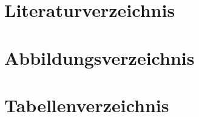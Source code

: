 \documentclass{fhnwreport}
\numberwithin{equation}{section}
\begin{document}
\section{Literaturverzeichnis}
{\def\section*#1{}}
\newpage
\section{Abbildungsverzeichnis}
{\def\section*#1{}\listoffigures{}}
\section{Tabellenverzeichnis}
{\def\section*#1{}\listoftables{}}
\newpage
\begin{appendix}

\end{appendix}

\end{document}
